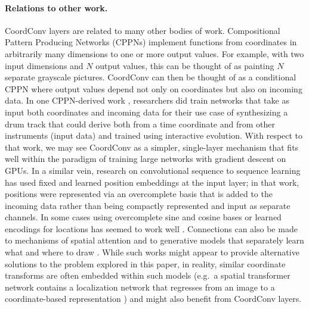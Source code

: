 \documentclass{article}
\begin{document}
\paragraph{Relations to other work.} \vspace*{-0.6em}
CoordConv layers are related to many other bodies of work.
Compositional Pattern Producing Networks (CPPNs)
\cite{stanley-2007-GPEM-compositional-pattern-producing}
implement functions from coordinates in arbitrarily many dimensions to one or more output values. For example, with two input dimensions and $N$ output values, this can be thought of as painting $N$ separate grayscale pictures.
CoordConv can then be thought of as a conditional CPPN where output values depend not only on coordinates but also on incoming data.
In one CPPN-derived work \cite{hoover-2009-ConnSci-exploiting-functional-relationships}, researchers did train networks that take as input both coordinates and incoming data for their use case of synthesizing a drum track that could derive both from a time coordinate and from other instruments (input data) and trained using interactive evolution. With respect to that work, we may see CoordConv as a simpler, single-layer mechanism that fits well within the paradigm of training large networks with gradient descent on GPUs.
In a similar vein, research on convolutional sequence to sequence learning \cite{gehring-2017-arXiv-convolutional-sequence-to-sequence} has used fixed and learned position embeddings at the input layer; in that work, positions were represented via an overcomplete basis that is added to the incoming data rather than being compactly represented and input as separate channels. In some cases using overcomplete sine and cosine bases or learned encodings for locations has seemed to work well \cite{vaswani-2017-NIPS-attention-is-all-you-need, parmar2018image}.
Connections can also be made to mechanisms of spatial attention \cite{jaderberg:spatial} and to generative models that separately learn what and where to draw \cite{gregor-2015-draw:-a-recurrent-neural, whatwhere_gan}. While such works might appear to provide alternative solutions to the problem explored in this paper, in reality, similar coordinate transforms are often embedded within such models (e.g.\ a spatial transformer network contains a localization network that regresses from an image to a coordinate-based representation \cite{jaderberg:spatial}) and might also benefit from CoordConv layers. 
\end{document}
